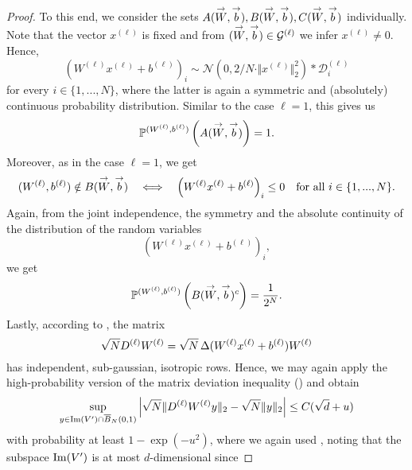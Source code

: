 \begin{proof}
 To this end, we consider the sets $A(\overset{\rightarrow}{W}, \overset{\rightarrow}{b}), B(\overset{\rightarrow}{W}, \overset{\rightarrow}{b}), C(\overset{\rightarrow}{W}, \overset{\rightarrow}{b})$ individually. Note that the vector $x^{(\ell)}$ is fixed and from $(\overset{\rightarrow}{W}, \overset{\rightarrow}{b}) \in \mathcal{G}^{(\ell)}$ we infer $x^{(\ell)} \neq 0$. Hence,
 \begin{equation*}
 \left(W^{(\ell)} x^{(\ell)} + b^{(\ell)} \right)_i \sim \mathcal{N}(0, 2/N \cdot \Vert x^{(\ell)} \Vert_2^2) * \mathcal{D}^{(\ell)}_i
 \end{equation*}
 for every $i \in \{1,...,N\}$, where the latter is again a symmetric and (absolutely) continuous probability distribution. Similar to the case $\ell = 1$, this gives us 
 \begin{equation*}
 \mathbb{P}^{(W^{(\ell)}, b^{(\ell)})} \left(A(\overset{\rightarrow}{W}, \overset{\rightarrow}{b})\right) = 1.
 \end{equation*}
 Moreover, as in the case $\ell = 1$, we get 
\begin{equation*}
(W^{(\ell)}, b^{(\ell)}) \notin B(\overset{\rightarrow}{W}, \overset{\rightarrow}{b}) \quad \Longleftrightarrow \quad \left(W^{(\ell)} x^{(\ell)} + b^{(\ell)} \right)_i \leq 0 \quad \text{for all } i \in \{1,...,N\}.
\end{equation*}
 Again, from the joint independence, the symmetry and the absolute continuity of the distribution of the random variables 
 \begin{equation*}
 \left(W^{(\ell)} x^{(\ell)} + b^{(\ell)} \right)_i , 
 \end{equation*}
 we get
 \begin{equation*}
 \mathbb{P}^{(W^{(\ell)}, b^{(\ell)})} \left(B(\overset{\rightarrow}{W}, \overset{\rightarrow}{b})^c\right) = \frac{1}{2^N}.
 \end{equation*}
 Lastly, according to , the matrix
\begin{equation*}
\sqrt{N} D^{(\ell)}W^{(\ell)} = \sqrt{N} \operatorname{\Delta}(W^{(\ell)}x^{(\ell)} + b^{(\ell)})W^{(\ell)}
\end{equation*}
has independent, sub-gaussian, isotropic rows. Hence, we may again apply the high-probability version of the matrix deviation inequality (\cite[Theorem 3]{Liaw2017}) and obtain
\begin{equation*}
\underset{y \in \operatorname{Im}(V') \cap \overline{B}_N(0,1)}{\sup} \left\vert \sqrt{N} \Vert D^{(\ell)}W^{(\ell)}y\Vert_2 - \sqrt{N} \Vert y \Vert_2\right\vert \leq C (\sqrt{d} + u) 
\end{equation*}
with probability at least $ 1 - \exp(-u^2)$, where we again used , noting that the subspace $\operatorname{Im}(V')$ is at most $d$-dimensional since

\end{proof}
